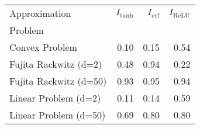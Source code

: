 \begin{tabular}{lrrr}
Approximation & $I_\text{tanh}$ & $I_\text{erf}$ & $I_\text{ReLU}$ \\
Problem &  &  &  \\
Convex Problem & 0.10 & 0.15 & 0.54 \\
\cline{1-4}
Fujita Rackwitz (d=2) & 0.48 & 0.94 & 0.22 \\
\cline{1-4}
Fujita Rackwitz (d=50) & 0.93 & 0.95 & 0.94 \\
\cline{1-4}
Linear Problem (d=2) & 0.11 & 0.14 & 0.59 \\
\cline{1-4}
Linear Problem (d=50) & 0.69 & 0.80 & 0.80 \\
\cline{1-4}
\end{tabular}
